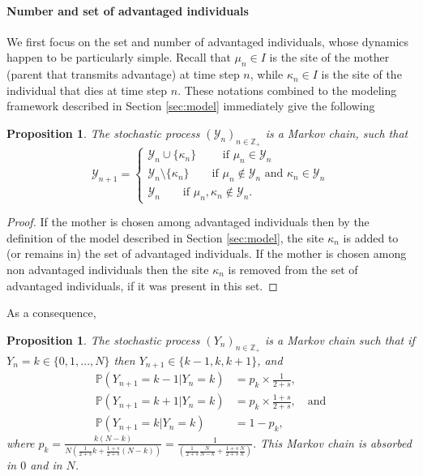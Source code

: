\documentclass[11pt]{article}
\newtheorem{proposition}[theorem]{Proposition}
\theoremstyle{remark}
\numberwithin{equation}{section}
\begin{document}
\paragraph*{Number and set of advantaged individuals } We first focus on the set and number of advantaged individuals, whose dynamics happen to be particularly simple. Recall that $\mu_n\in I$ is the site of the mother (parent that transmits advantage) at time step $n$, while $\kappa_n\in I$ is the site of the individual that dies at time step $n$. These notations combined to the modeling framework described in Section \ref{sec:model}
immediately give the following
\begin{proposition} \label{prop:Avantages}
The stochastic process $(\mathcal{Y}_n)_{n\in\mathbb{Z}_+}$ is a Markov chain, such that $$\mathcal{Y}_{n+1}=\begin{cases}
  \mathcal{Y}_n\cup\{\kappa_n\} \qquad \text{ if $\mu_n\in\mathcal{Y}_n$} \\
  \mathcal{Y}_n\setminus\{\kappa_n\}\qquad \text{if $\mu_n\notin\mathcal{Y}_n$ and $\kappa_n\in\mathcal{Y}_n$}\\
  \mathcal{Y}_n \qquad \text{if $\mu_n,\kappa_n\notin\mathcal{Y}_n$.}
\end{cases}$$
\end{proposition}

\begin{proof}
If the mother is chosen among advantaged individuals then by the definition of the model described in Section \ref{sec:model}, the site $\kappa_n$ is added to (or remains in) the set of advantaged individuals. If the mother is chosen among non advantaged individuals then the site $\kappa_n$ is removed from the set of advantaged individuals, if it was present in this set.
\end{proof}

As a consequence,

\begin{proposition}\label{prop:Y}
The stochastic process  $(Y_n)_{n\in\mathbb{Z}_+}$ is a Markov chain such that if $Y_n=k\in \{0,1,...,N\}$ then $Y_{n+1}\in\{k-1,k,k+1\}$, and \begin{align*}\mathbb{P}(Y_{n+1}=k-1|Y_n=k)&=p_k\times\frac{1}{2+s},\\\mathbb{P}(Y_{n+1}=k+1|Y_n=k)&=p_k\times\frac{1+s}{2+s},\quad\text{and}\\\mathbb{P}(Y_{n+1}=k|Y_n=k)&=1-p_k,\end{align*} where $p_k=\frac{k(N-k)}{N\left(\frac{1}{2+s}k+\frac{1+s}{2+s}(N-k)\right)}=\frac{1}{\left(\frac{1}{2+s}\frac{N}{N-k}+\frac{1+s}{2+s}\frac{N}{k}\right)}.$ This Markov chain is absorbed in $0$ and in $N$.
\end{proposition}
\end{document}
